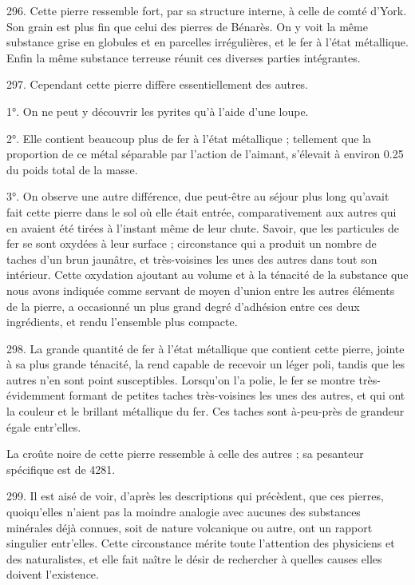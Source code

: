 \documentclass[a4paper, 11pt, oneside, polutonikogreek, french]{article}
\begin{document}
296. Cette pierre ressemble fort, par sa structure interne, à celle de comté d'York. Son grain est plus fin que celui des pierres de Bénarès. On y voit la même substance grise en globules et en parcelles irrégulières, et le fer à l'état métallique. Enfin la même substance terreuse réunit ces diverses parties intégrantes.

297. Cependant cette pierre diffère essentiellement des autres.

1°. On ne peut y découvrir les pyrites qu'à l'aide d'une loupe.

2°. Elle contient beaucoup plus de fer à l'état métallique ; tellement que la proportion de ce métal séparable par l'action de l'aimant, s'élevait à environ 0.25 du poids total de la masse.

3°. On observe une autre différence, due peut-être au séjour plus long qu'avait fait cette pierre dans le sol où elle était entrée, comparativement aux autres qui en avaient été tirées à l'instant même de leur chute. Savoir, que les particules de fer se sont oxydées à leur surface ; circonstance qui a produit un nombre de taches d'un brun jaunâtre, et très-voisines les unes des autres dans tout son intérieur. Cette oxydation ajoutant au volume et à la ténacité de la substance que nous avons indiquée comme servant de moyen d'union entre les autres éléments de la pierre, a occasionné un plus grand degré d'adhésion entre ces deux ingrédients, et rendu l'ensemble plus compacte.

298. La grande quantité de fer à l'état métallique que contient cette pierre, jointe à sa plus grande ténacité, la rend capable de recevoir un léger poli, tandis que les autres n'en sont point susceptibles. Lorsqu'on l'a polie, le fer se montre très-évidemment formant de petites taches très-voisines les unes des autres, et qui ont la couleur et le brillant métallique du fer. Ces taches sont à-peu-près de grandeur égale entr'elles.

La croûte noire de cette pierre ressemble à celle des autres ; sa pesanteur spécifique est de 4281.

299. Il est aisé de voir, d'après les descriptions qui précèdent, que ces pierres, quoiqu'elles n'aient pas la moindre analogie avec aucunes des substances minérales déjà connues, soit de nature volcanique ou autre, ont un rapport singulier entr'elles. Cette circonstance mérite toute l'attention des physiciens et des naturalistes, et elle fait naître le désir de rechercher à quelles causes elles doivent l'existence.
\end{document}
